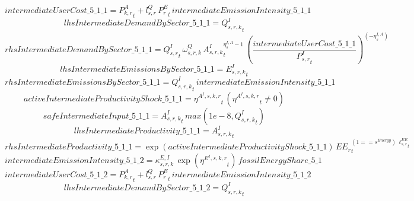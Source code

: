 \begin{dmath*}
intermediateUserCost\_5\_1\_1 = {{P^{A}_{k,r}}}_{t}+{{l^{Q}_{s,r}}}\, {{P^E_r}}_{t}\, {intermediateEmissionIntensity\_5\_1\_1}
\end{dmath*}
\begin{dmath*}
lhsIntermediateDemandBySector\_5\_1\_1 = {{Q^{I}_{s,r,k}}}_{t}
\end{dmath*}
\begin{dmath*}
rhsIntermediateDemandBySector\_5\_1\_1 = {{Q^{I}_{s,r}}}_{t}\, {{\omega^{Q}_{s,r,k}}}\, {{A^{I}_{s,r,k}}}_{t}^{{{\eta^{I,A}_{s}}}-1}\, \left(\frac{{intermediateUserCost\_5\_1\_1}}{{{P^{I}_{s,r}}}_{t}}\right)^{\left(-{{\eta^{I,A}_{s}}}\right)}
\end{dmath*}
\begin{dmath*}
lhsIntermediateEmissionsBySector\_5\_1\_1 = {{E^I_{s,r,k}}}_{t}
\end{dmath*}
\begin{dmath*}
rhsIntermediateEmissionsBySector\_5\_1\_1 = {{Q^{I}_{s,r,k}}}_{t}\, {intermediateEmissionIntensity\_5\_1\_1}
\end{dmath*}
\begin{dmath*}
activeIntermediateProductivityShock\_5\_1\_1 = {{\eta^{A^{I},s,k,r}}}_{t}\, \left({{\eta^{A^{I},s,k,r}}}_{t}\neq 0\right)
\end{dmath*}
\begin{dmath*}
safeIntermediateInput\_5\_1\_1 = {{A^{I}_{s,r,k}}}_{t}\, max(1e-8,{{Q^{I}_{s,r,k}}}_{t})
\end{dmath*}
\begin{dmath*}
lhsIntermediateProductivity\_5\_1\_1 = {{A^{I}_{s,r,k}}}_{t}
\end{dmath*}
\begin{dmath*}
rhsIntermediateProductivity\_5\_1\_1 = \exp\left({activeIntermediateProductivityShock\_5\_1\_1}\right)\, {{EE_r}}_{t}^{\left(1=={{s^{Energy}}}\right)\, {{\ell^{EE}_{s,r}}}_{t}}
\end{dmath*}
\begin{dmath*}
intermediateEmissionIntensity\_5\_1\_2 = {{\kappa^{E,I}_{s,r,k}}}\, \exp\left({{\eta^{E^{I},s,k,r}}}_{t}\right)\, {fossilEnergyShare\_5\_1}
\end{dmath*}
\begin{dmath*}
intermediateUserCost\_5\_1\_2 = {{P^{A}_{k,r}}}_{t}+{{l^{Q}_{s,r}}}\, {{P^E_r}}_{t}\, {intermediateEmissionIntensity\_5\_1\_2}
\end{dmath*}
\begin{dmath*}
lhsIntermediateDemandBySector\_5\_1\_2 = {{Q^{I}_{s,r,k}}}_{t}
\end{dmath*}
